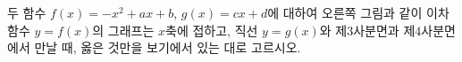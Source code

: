 \noindent\begin{minipage}[t]{0.58\linewidth}\vspace{0pt}\raggedright 두 함수 $f(x)=-x^2+ax+b$, $g(x)=cx+d$에 대하여 오른쪽 그림과 같이 이차함수 $y=f(x)$의 그래프는 $x$축에 접하고, 직선 $y=g(x)$와 제$3$사분면과 제$4$사분면에서 만날 때, 옳은 것만을 보기에서 있는 대로 고르시오. \end{minipage}\hfill\begin{minipage}[t]{0.4\linewidth}\vspace{0pt}\centering \resizebox{\ifdim\width>\linewidth\linewidth\else\width\fi}{!}{}\end{minipage}\par
\noindent {}
